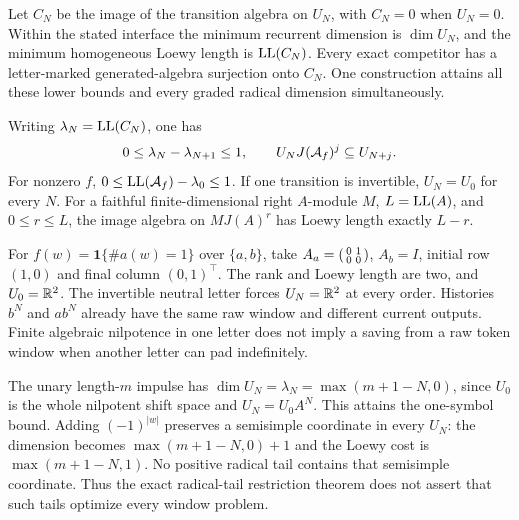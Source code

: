 \begin{theorem}\label{III:S:thm:window}
Let $C_N$ be the image of the transition algebra on $U_N$, with $C_N=0$ when $U_N=0$. Within the stated interface the minimum recurrent dimension is $\dim U_N$, and the minimum homogeneous Loewy length is $\operatorname{LL}(C_N)$. Every exact competitor has a letter-marked generated-algebra surjection onto $C_N$. One construction attains all these lower bounds and every graded radical dimension simultaneously.
\end{theorem}


\begin{theorem}\label{III:S:thm:windowbounds}
Writing $\lambda_N=\operatorname{LL}(C_N)$, one has
\[
 0\le\lambda_N-\lambda_{N+1}\le1,\qquad
 U_NJ(\mathcal A_f)^j\subseteq U_{N+j}.
\]
For nonzero $f$, $0\le\operatorname{LL}(\mathcal A_f)-\lambda_0\le1$. If one transition is invertible, $U_N=U_0$ for every $N$. For a faithful finite-dimensional right $A$-module $M$, $L=\operatorname{LL}(A)$, and $0\le r\le L$, the image algebra on $MJ(A)^r$ has Loewy length exactly $L-r$.
\end{theorem}


\begin{example}
For $f(w)=\mathbf1\{\#a(w)=1\}$ over $\{a,b\}$, take $A_a=\begin{psmallmatrix}0&1\\0&0\end{psmallmatrix}$, $A_b=I$, initial row $(1,0)$ and final column $(0,1)^\top$. The rank and Loewy length are two, and $U_0=\mathbb R^2$. The invertible neutral letter forces $U_N=\mathbb R^2$ at every order. Histories $b^N$ and $ab^N$ already have the same raw window and different current outputs. Finite algebraic nilpotence in one letter does not imply a saving from a raw token window when another letter can pad indefinitely.
\end{example}

\begin{example}
The unary length-$m$ impulse has $\dim U_N=\lambda_N=\max(m+1-N,0)$, since $U_0$ is the whole nilpotent shift space and $U_N=U_0A^N$. This attains the one-symbol bound. Adding $(-1)^{|w|}$ preserves a semisimple coordinate in every $U_N$: the dimension becomes $\max(m+1-N,0)+1$ and the Loewy cost is $\max(m+1-N,1)$. No positive radical tail contains that semisimple coordinate. Thus the exact radical-tail restriction theorem does not assert that such tails optimize every window problem.
\end{example}

